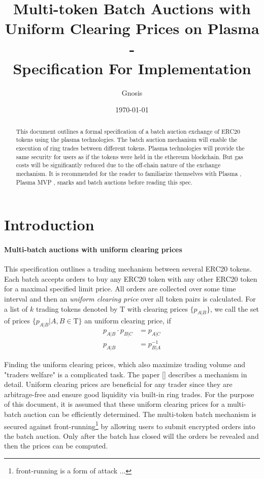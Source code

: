 \documentclass[11pt,parskip=full]{scrartcl}%
\title{
  Multi-token Batch Auctions with Uniform Clearing Prices on Plasma\\
  - \\
  \Large Specification For Implementation}
\author{Gnosis}
\date{\today}
\newcommand{\Tau}{\mathrm{T}}
\begin{document}
\maketitle


\begin{abstract}

This document outlines a formal specification of a batch auction exchange of ERC20 tokens using the plasma technologies. The batch auction mechanism will enable the execution of ring trades between different tokens. Plasma technologies will provide the same security for users as if the tokens were held in the ethereum blockchain. But gas costs will be significantly reduced due to the off-chain nature of the exchange mechanism. It is recommended for the reader to familiarize themselves with Plasma \cite{plasma}, Plasma MVP \cite{MVP}, snarks \cite{snarks} and batch auctions \cite{batch} before reading this spec.

\end{abstract}

\tableofcontents

\newpage
\section{Introduction}
\label{sec:introduction}

\paragraph{Multi-batch auctions with uniform clearing prices}

This specification outlines a trading mechanism between several ERC20 tokens. Each batch accepts orders to buy any ERC20 token with any other ERC20 token for a maximal specified limit price. All orders are collected over some time interval and then an \emph{uniform clearing price} over all token pairs is calculated. 
For a list of $k$ trading tokens denoted by $\Tau$ with clearing prices $\{p_{A|B}\}$, we call the set of prices $\{p_{A|B}| A,B \in \Tau \}$ an uniform clearing price, if
\begin{align} \label{eq:arbitrage_freeness}
  p_{A|B} \cdot p_{B|C} &= p_{A|C}\\
  p_{A|B} &= p_{B|A}^{-1}
\end{align}

Finding the uniform clearing prices, which also maximize trading volume and "traders welfare" is a complicated task. The paper [] describes a mechanism in detail. Uniform clearing prices are beneficial for any trader since they are arbitrage-free and ensure good liquidity via built-in ring trades. For the purpose of this document, it is assumed that these uniform clearing prices for a multi-batch auction can be efficiently determined. \newline
The multi-token batch mechanism is secured against front-running\footnote{front-running is a form of attack ...} by allowing users to submit encrypted orders into the batch auction. Only after the batch has closed will the orders be revealed and then the prices can be computed. 
\end{document}
